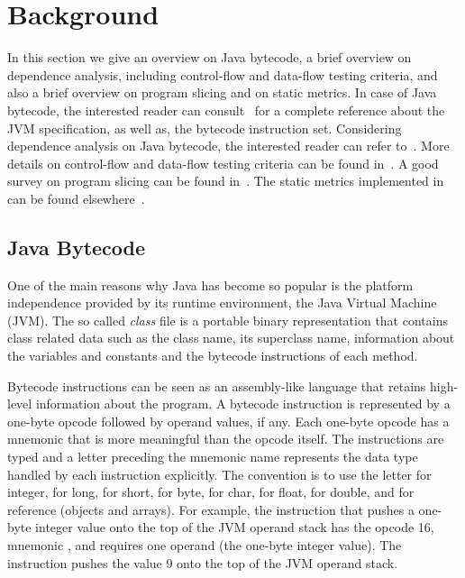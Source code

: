 \section{Background}\label{sec:background}

In this section we give an overview on Java bytecode, a brief
overview on dependence analysis, including control-flow and
data-flow testing criteria, and also a brief overview on program
slicing and on static metrics. In case of Java bytecode, the
interested reader can consult~\cite{Lindholm99JVMS} for a complete
reference about the JVM specification, as well as, the bytecode
instruction set. Considering dependence analysis on Java bytecode,
the interested reader can refer to~\cite{Zhao00DAJB}. More details
on control-flow and data-flow testing criteria can be found
in~\cite{Rapps85SSTD,Sinha99CTEH}. A good survey on program
slicing can be found in~\cite{Tip95SPST}. The static metrics
implemented in \toolname can be found
elsewhere~\cite{Lorenz94OOSM,Chidamber94MSOO}.

\subsection{Java Bytecode}\label{sec-bytecode}

One of the main reasons why Java has become so popular is the
platform independence provided by its runtime environment, the
Java Virtual Machine (JVM). The so called \emph{class} file is a
portable binary representation that contains class related data
such as the class name, its superclass name, information about the
variables and constants and the bytecode instructions of each
method.

Bytecode instructions can be seen as an assembly-like language
that retains high-level information about the program. A bytecode
instruction is represented by a one-byte opcode followed by
operand values, if any. Each one-byte opcode has a mnemonic that
is more meaningful than the opcode itself. The instructions are
typed and a letter preceding the mnemonic name represents the data
type handled by each instruction explicitly. The convention is to
use the letter  for integer,  for long,  for
short,  for byte,  for char,  for float,
 for double, and  for reference (objects and
arrays). For example, the instruction that pushes a one-byte
integer value onto the top of the JVM operand stack has the opcode
16, mnemonic , and requires one operand (the one-byte
integer value). The instruction  pushes the value 9
onto the top of the JVM operand stack.

